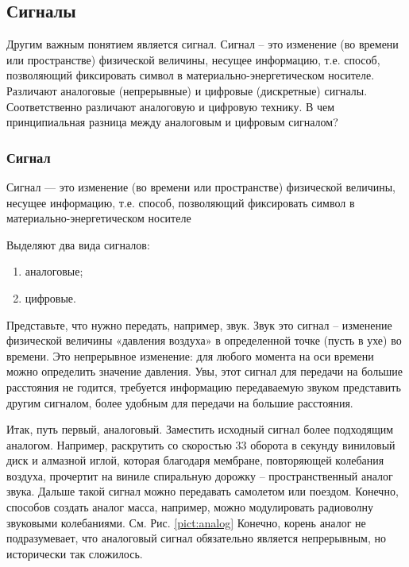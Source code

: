 \subsection{Сигналы}

Другим важным понятием является сигнал. Сигнал – это изменение (во времени или пространстве) физической величины, несущее информацию, т.е. способ, позволяющий фиксировать символ в материально-энергетическом носителе. Различают аналоговые (непрерывные) и цифровые (дискретные) сигналы. Соответственно различают аналоговую и цифровую технику. В чем принципиальная разница между аналоговым и цифровым сигналом?

\begin{frame}
\frametitle{Сигнал}
\begin{definition}
    \alert{Сигнал} --- это изменение (во времени или пространстве) физической величины, несущее информацию, т.е. способ, позволяющий фиксировать \alert{символ} в материально-энергетическом носителе
\end{definition}
Выделяют два вида сигналов:
\begin{enumerate}
    \item аналоговые;
    \item цифровые.
\end{enumerate}
\end{frame}


Представьте, что нужно передать, например, звук. Звук это сигнал – изменение физической величины «давления воздуха» в определенной точке (пусть в ухе) во времени. Это непрерывное изменение: для любого момента на оси времени можно определить значение давления. Увы, этот сигнал для передачи на большие расстояния не годится, требуется информацию передаваемую звуком представить другим сигналом, более удобным для передачи на большие расстояния.

Итак, путь первый, аналоговый. Заместить исходный сигнал более подходящим аналогом. Например, раскрутить со скоростью 33 оборота в секунду виниловый диск и алмазной иглой, которая благодаря мембране, повторяющей колебания воздуха, прочертит на виниле спиральную дорожку – пространственный аналог звука. Дальше такой сигнал можно передавать самолетом или поездом. Конечно, способов создать аналог масса, например, можно модулировать радиоволну звуковыми колебаниями. См. Рис. \ref{pict:analog}  Конечно, корень аналог не подразумевает, что аналоговый сигнал обязательно является непрерывным, но исторически так сложилось.

